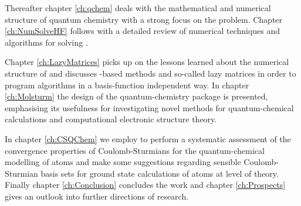 Thereafter chapter \ref{ch:qchem}
deals with the mathematical and numerical structure of quantum chemistry
with a strong focus on the \HF problem.
Chapter \ref{ch:NumSolveHF}
follows with a detailed review of numerical techniques and \SCF algorithms
for solving \HF.

Chapter \ref{ch:LazyMatrices}
picks up on the lessons learned about the numerical structure
of \HF and discusses
\contraction-based methods and so-called lazy matrices
in order to program algorithms
in a basis-function independent way.
In chapter \ref{ch:Molsturm} the design of the quantum-chemistry
package \molsturm is presented,
emphasising its usefulness for investigating novel methods
for quantum-chemical calculations
and computational electronic structure theory.

In chapter \ref{ch:CSQChem} we employ \molsturm
to perform a systematic assessment of
the convergence properties of Coulomb-Sturmians
for the quantum-chemical modelling of atoms
and make some suggestions regarding
sensible Coulomb-Sturmian basis sets for ground state calculations of atoms
at \HF level of theory.
Finally chapter \ref{ch:Conclusion} concludes the work and
chapter \ref{ch:Prospects} gives
an outlook into further directions of research.
